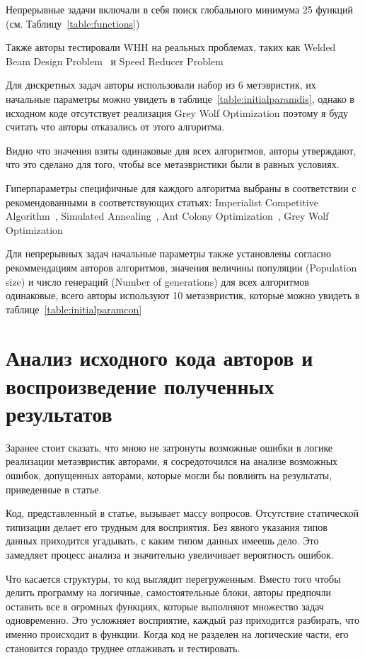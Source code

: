 \documentclass[a4paper,12pt]{extarticle}
\begin{document}
Непрерывные задачи включали в себя поиск глобального минимума 25 функций (см. Таблицу~\ref{table:functions}) 

Также авторы тестировали WHH на реальных проблемах, таких как Welded Beam Design Problem~\cite{weldedbeam} и Speed Reducer Problem~\cite{speedred}

Для дискретных задач авторы использовали набор из 6 метэвристик, их начальные параметры можно увидеть в таблице~\ref{table:initialparamdis}, однако в исходном коде отсутствует реализация Grey Wolf Optimization поэтому я буду считать что авторы отказались от этого алгоритма.

Видно что значения взяты одинаковые для всех алгоритмов, авторы утверждают, что это сделано для того, чтобы все метаэвристики были в равных условиях.

Гиперпараметры специфичные для каждого алгоритма выбраны в соответствии с рекомендованными в соответствующих статьях: Imperialist Competitive Algorithm~\cite{ICA}, Simulated Annealing~\cite{SA}, 	Ant Colony Optimization~\cite{ACO}, Grey Wolf Optimization~\cite{GWO}

Для непрерывных задач начальные параметры также установлены согласно рекоммендациям авторов алгоритмов, значения величины популяции (Population size) и число генераций (Number of generations) для всех алгоритмов одинаковые, всего авторы используют 10 метаэвристик, которые можно увидеть в таблице~\ref{table:initialparamcon}

\section{Анализ исходного кода авторов и воспроизведение полученных результатов}

Заранее стоит сказать, что мною не затронуты возможные ошибки в логике реализации метаэвристик авторами, я сосредоточился на анализе возможных ошибок, допущенных авторами, которые могли бы повлиять на результаты, приведенные в статье.

Код, представленный в статье, вызывает массу вопросов. Отсутствие статической типизации делает его трудным для восприятия. Без явного указания типов данных приходится угадывать, с каким типом данных имеешь дело. Это замедляет процесс анализа и значительно увеличивает вероятность ошибок.

Что касается структуры, то код выглядит перегруженным. Вместо того чтобы делить программу на логичные, самостоятельные блоки, авторы предпочли оставить все в огромных функциях, которые выполняют множество задач одновременно. Это усложняет восприятие, каждый раз приходится разбирать, что именно происходит в функции. Когда код не разделен на логические части, его становится гораздо труднее отлаживать и тестировать.
\end{document}
